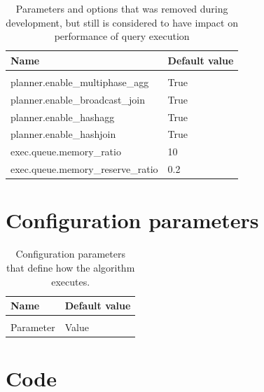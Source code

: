 \documentclass[a4paper,english]{report}
\begin{document}
\begin{table}[ht]
	\centering
	\caption{Parameters and options that was removed during development, but still is considered to have impact on performance of query execution}
	\label{table:removed_params}
	\begin{tabular}{ll}
		\\
		\multicolumn{1}{l}{\bfseries Name} & \multicolumn{1}{l}{\bfseries Default value} \\ \hline \\
		planner.enable\_multiphase\_agg & True  \\
		planner.enable\_broadcast\_join & True  \\
		planner.enable\_hashagg & True  \\
		planner.enable\_hashjoin & True  \\
		exec.queue.memory\_ratio & 10  \\ 
		exec.queue.memory\_reserve\_ratio & 0.2  \\
	\end{tabular}
\end{table}

\chapter{Configuration parameters}
\begin{table}[ht]
	\centering
	\caption{Configuration parameters that define how the algorithm executes.}
	\label{table:conf_params}
	\begin{tabular}{ll}
		\\
		\multicolumn{1}{l}{\bfseries Name} & \multicolumn{1}{l}{\bfseries Default value} \\ \hline \\
		Parameter & Value  \\
	\end{tabular}
\end{table}

\chapter{Code}
\end{document}
